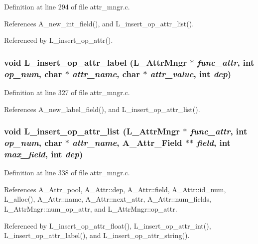 Definition at line 294 of file attr\_\-mngr.c.

References A\_\-new\_\-int\_\-field(), and L\_\-insert\_\-op\_\-attr\_\-list().

Referenced by L\_\-insert\_\-op\_\-attr().
\subsubsection{\setlength{\rightskip}{0pt plus 5cm}void L\_\-insert\_\-op\_\-attr\_\-label (\bf{L\_\-Attr\-Mngr} $\ast$ {\em func\_\-attr}, int {\em op\_\-num}, char $\ast$ {\em attr\_\-name}, char $\ast$ {\em attr\_\-value}, int {\em dep})}\label{attr__mngr_8h_9b1b50a8a64362c5a646a9bc4633153f}




Definition at line 327 of file attr\_\-mngr.c.

References A\_\-new\_\-label\_\-field(), and L\_\-insert\_\-op\_\-attr\_\-list().
\subsubsection{\setlength{\rightskip}{0pt plus 5cm}void L\_\-insert\_\-op\_\-attr\_\-list (\bf{L\_\-Attr\-Mngr} $\ast$ {\em func\_\-attr}, int {\em op\_\-num}, char $\ast$ {\em attr\_\-name}, \bf{A\_\-Attr\_\-Field} $\ast$$\ast$ {\em field}, int {\em max\_\-field}, int {\em dep})}\label{attr__mngr_8h_e018e737cddb70d6447bd5be0527cda6}




Definition at line 338 of file attr\_\-mngr.c.

References A\_\-Attr\_\-pool, A\_\-Attr::dep, A\_\-Attr::field, A\_\-Attr::id\_\-num, L\_\-alloc(), A\_\-Attr::name, A\_\-Attr::next\_\-attr, A\_\-Attr::num\_\-fields, L\_\-Attr\-Mngr::num\_\-op\_\-attr, and L\_\-Attr\-Mngr::op\_\-attr.

Referenced by L\_\-insert\_\-op\_\-attr\_\-float(), L\_\-insert\_\-op\_\-attr\_\-int(), L\_\-insert\_\-op\_\-attr\_\-label(), and L\_\-insert\_\-op\_\-attr\_\-string().
